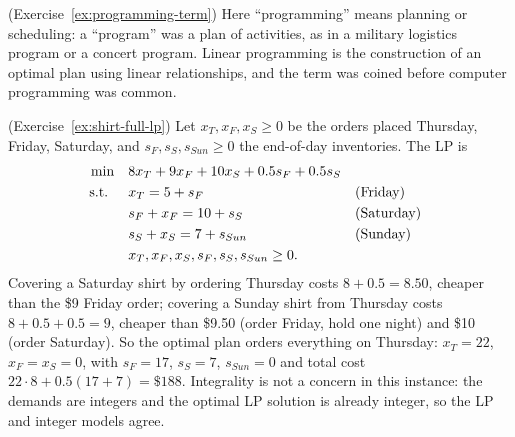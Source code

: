 \begin{solution}(Exercise~\ref{ex:programming-term})
Here ``programming'' means planning or scheduling: a ``program'' was a plan of activities, as in a military logistics program or a concert program.  Linear programming is the construction of an optimal plan using linear relationships, and the term was coined before computer programming was common.
\end{solution}

\begin{solution}(Exercise~\ref{ex:shirt-full-lp})
Let $x_T, x_F, x_S \geq 0$ be the orders placed Thursday, Friday, Saturday, and $s_F, s_S, s_{Sun} \geq 0$ the end-of-day inventories.  The LP is
\begin{align*}
\min \quad & 8x_T + 9x_F + 10x_S + 0.5s_F + 0.5s_S\\
\text{ s.t. } \quad & x_T = 5 + s_F && \text{(Friday)}\\
& s_F + x_F = 10 + s_S && \text{(Saturday)}\\
& s_S + x_S = 7 + s_{Sun} && \text{(Sunday)}\\
& x_T, x_F, x_S, s_F, s_S, s_{Sun} \geq 0.
\end{align*}
Covering a Saturday shirt by ordering Thursday costs $8 + 0.5 = 8.50$, cheaper than the \$9 Friday order; covering a Sunday shirt from Thursday costs $8 + 0.5 + 0.5 = 9$, cheaper than \$9.50 (order Friday, hold one night) and \$10 (order Saturday).  So the optimal plan orders everything on Thursday: $x_T = 22$, $x_F = x_S = 0$, with $s_F = 17$, $s_S = 7$, $s_{Sun} = 0$ and total cost $22 \cdot 8 + 0.5(17 + 7) = \$188$.  Integrality is not a concern in this instance: the demands are integers and the optimal LP solution is already integer, so the LP and integer models agree.
\end{solution}

%
%
%
